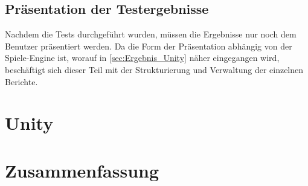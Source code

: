 \subsection{Präsentation der Testergebnisse}

Nachdem die Tests durchgeführt wurden, müssen die Ergebnisse nur noch dem Benutzer präsentiert werden. Da die Form der Präsentation abhängig von der Spiele-Engine ist, worauf in \autoref{sec:Ergebnis_Unity} näher eingegangen wird, beschäftigt sich dieser Teil mit der Strukturierung und Verwaltung der einzelnen Berichte.

\section{Unity}
\label{sec:Ergebnis_Unity}

\section{Zusammenfassung}